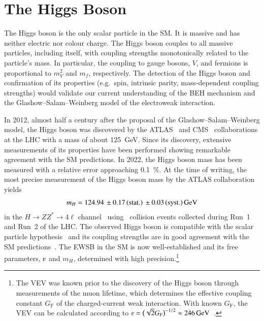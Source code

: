 \section{The Higgs Boson}%
\label{sec:higgs_boson}

The Higgs boson is the only scalar particle in the SM. It is massive and has
neither electric nor colour charge. The Higgs boson couples to all massive
particles, including itself, with coupling strengths monotonically related to
the particle's mass. In particular, the coupling to gauge bosons, $V$, and
fermions is proportional to $m_V^2$ and $m_f$, respectively.
The detection of the Higgs boson and confirmation of its
properties (e.g.\ spin, intrinsic parity, mass-dependent coupling strengths)
would validate our current understanding of the BEH mechanism and the
Glashow--Salam--Weinberg model of the electroweak interaction.

In 2012, almost half a century after the proposal of the
Glashow--Salam--Weinberg model, the Higgs boson was discovered by the
ATLAS~\cite{HIGG-2012-27} and CMS~\cite{CMS-HIG-12-028} collaborations at the
LHC with a mass of about \SI{125}{\GeV}. Since its discovery, extensive
measurements of its properties have been performed showing remarkable agreement
with the SM predictions. In 2022, the Higgs boson mass has been measured with a
relative error approaching \SI{0.1}{\percent}. At the time of writing, the most
precise measurement of the Higgs boson mass by the ATLAS collaboration yields
\begin{align*}
  m_{H} = \num{124.94}%
  \valuesep\numerrt{0.17}{stat.}%
  \valuesep\numerrt{0.03}{syst.}%
  \valuesep\si{\GeV}
\end{align*}
in the $H \to Z Z^{*} \to 4\ell$ channel~\cite{HIGG-2020-07} using \pp~collision
events collected during Run~1 and Run~2 of the LHC. The observed Higgs boson is
compatible with the scalar particle
hypothesis~\cite{HIGG-2013-17-witherratum,CMS-HIG-14-018} and its coupling
strengths are in good agreement with the SM
predictions~\cite{HIGG-2021-23,CMS-HIG-22-001}. The EWSB in the SM is now
well-established and its free parameters, $\varv$ and $m_{H}$, determined with
high precision.\footnote{The VEV was known prior to the discovery of the Higgs
  boson through measurements of the muon lifetime, which determines the
  effective coupling constant $G_{\text{F}}$ of the charged-current weak
  interaction. With known $G_{\text{F}}$, the VEV can be calculated according to
  $\varv = \bigl( \sqrt{2} G_{\text{F}} \bigr)^{-1/2} \approx
  \SI{246}{\GeV}$~\cite{MuLan:2010shf}.}


